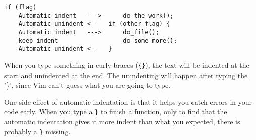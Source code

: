 \begin{Verbatim}[samepage=true]
                             if (flag)
    Automatic indent   --->      do_the_work();
    Automatic unindent <--   if (other_flag) {
    Automatic indent   --->      do_file();
    keep indent                  do_some_more();
    Automatic unindent <--   }
\end{Verbatim}

When you type something in curly braces (\texttt{\{\}}), the text will be indented at the start and unindented at the end.
The unindenting will happen after typing the '\texttt{}\}', since Vim can't guess what you are going to type.

One side effect of automatic indentation is that it helps you catch errors in your code early.
When you type a \texttt{\}} to finish a function, only to find that the automatic indentation gives it more indent than what you expected, there is probably a \texttt{\}} missing.
